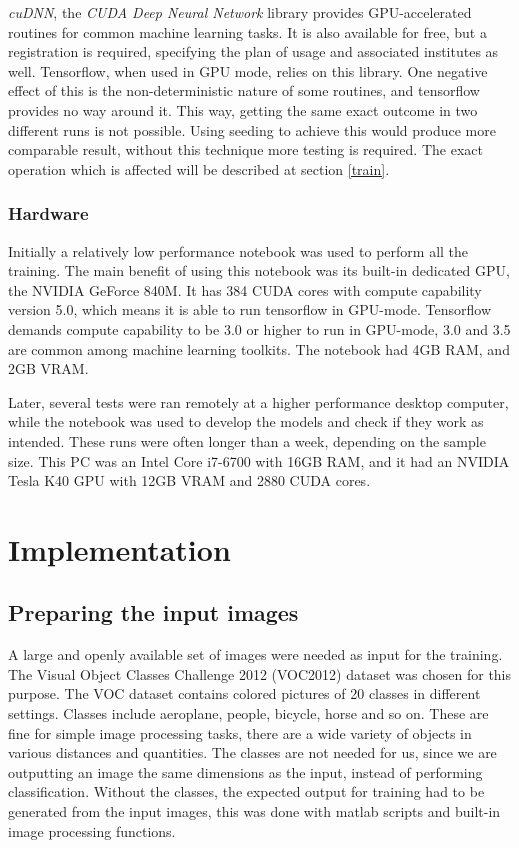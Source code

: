 \documentclass[12pt]{report}
\begin{document}
\label{cudnn}
\textit{cuDNN}, the \textit{CUDA Deep Neural Network} library provides GPU-accelerated routines for common machine learning tasks. It is also available for free, but a registration is required, specifying the plan of usage and associated institutes as well. Tensorflow, when used in GPU mode, relies on this library. One negative effect of this is the non-deterministic nature of some routines, and tensorflow provides no way around it. This way, getting the same exact outcome in two different runs is not possible. Using seeding to achieve this would produce more comparable result, without this technique more testing is required. The exact operation which is affected will be described at section \ref{train}.
\subsection{Hardware}
Initially a relatively low performance notebook was used to perform all the training. The main benefit of using this notebook was its built-in dedicated GPU, the NVIDIA GeForce 840M. It has 384 CUDA cores with compute capability version 5.0, which means it is able to run tensorflow in GPU-mode. Tensorflow demands compute capability to be 3.0 or higher to run in GPU-mode, 3.0 and 3.5 are common among machine learning toolkits. The notebook had 4GB RAM, and 2GB VRAM.

Later, several tests were ran remotely at a higher performance desktop computer, while the notebook was used to develop the models and check if they work as intended. These runs were often longer than a week, depending on the sample size. This PC was an Intel Core i7-6700 with 16GB RAM, and it had an NVIDIA Tesla K40 GPU with 12GB VRAM and 2880 CUDA cores.
\chapter{Implementation}
\section{Preparing the input images}
A large and openly available set of images were needed as input for the training. The Visual Object Classes Challenge 2012 (VOC2012) dataset \cite{pascal-voc-2012} was chosen for this purpose. The VOC dataset contains colored pictures of 20 classes in different settings. Classes include aeroplane, people, bicycle, horse and so on. These are fine for simple image processing tasks, there are a wide variety of objects in various distances and quantities. The classes are not needed for us, since we are outputting an image the same dimensions as the input, instead of performing classification. Without the classes, the expected output for training had to be generated from the input images, this was done with matlab scripts and built-in image processing functions.
\end{document}
